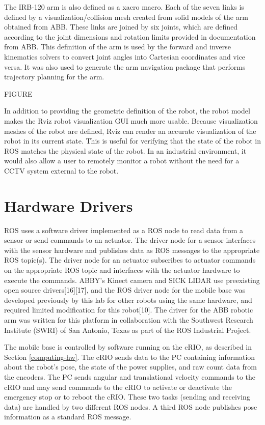\documentclass[]{cwru} %
\begin{document}
The IRB-120 arm is also defined as a xacro macro. Each of the seven
links is defined by a visualization/collision mesh created from solid
models of the arm obtained from ABB. These links are joined by six
joints, which are defined according to the joint dimensions and rotation
limits provided in documentation from ABB. This definition of the arm is
used by the forward and inverse kinematics solvers to convert joint
angles into Cartesian coordinates and vice versa. It was also used to
generate the arm navigation package that performs trajectory planning
for the arm.

FIGURE

In addition to providing the geometric definition of the robot, the
robot model makes the Rviz robot visualization GUI much more usable.
Because visualization meshes of the robot are defined, Rviz can render
an accurate visualization of the robot in its current state. This is
useful for verifying that the state of the robot in ROS matches the
physical state of the robot. In an industrial environment, it would also
allow a user to remotely monitor a robot without the need for a CCTV
system external to the robot.

\section{Hardware Drivers}
\label{hardware-drivers}

ROS uses a
software driver implemented as a ROS node to read data from a sensor or
send commands to an actuator. The driver node for a sensor interfaces
with the sensor hardware and publishes data as ROS messages to the
appropriate ROS topic(s). The driver node for an actuator subscribes to
actuator commands on the appropriate ROS topic and interfaces with the
actuator hardware to execute the commands. ABBY's Kinect camera and SICK
LIDAR use preexisting open source drivers{[}16{]}{[}17{]}, and the ROS
driver node for the mobile base was developed previously by this lab for
other robots using the same hardware, and required limited modification
for this robot{[}10{]}. The driver for the ABB robotic arm was written
for this platform in collaboration with the Southwest Research Institute
(SWRI) of San Antonio, Texas as part of the ROS Industrial Project.

The mobile
base is controlled by software running on the cRIO, as described in Section
\ref{computing-hw}. The cRIO sends data to the PC containing information
about the robot's pose, the state of the power supplies, and raw count
data from the encoders. The PC sends angular and translational velocity
commands to the cRIO and may send commands to the cRIO to activate or
deactivate the emergency stop or to reboot the cRIO. These two tasks
(sending and receiving data) are handled by two different ROS nodes. A
third ROS node publishes pose information as a standard ROS message.
\end{document}
